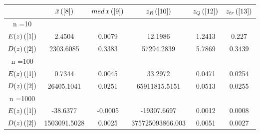 \begin{tabular}{|c|c|c|c|c|c|}
\hline
 & $\bar{x} \, (\ref{8})$ & $med \, x \, (\ref{9})$ & $z_R \, (\ref{10})$ & $z_Q \, (\ref{12})$ & $z_{tr} \, (\ref{13})$ \\
\hline
n =10 &  &  &  &  & \\
\hline
$E(z) \, (\ref{1})$ & 2.4504 & 0.0079 & 12.1986 & 1.2413 & 0.227\\
\hline
$D(z) \, (\ref{2})$ & 2303.6085 & 0.3383 & 57294.2839 & 5.7869 & 0.3439\\
\hline
n =100 &  &  &  &  & \\
\hline
$E(z) \, (\ref{1})$ & 0.7344 & 0.0045 & 33.2972 & 0.0471 & 0.0254\\
\hline
$D(z) \, (\ref{2})$ & 26405.1041 & 0.0251 & 65911815.5151 & 0.0513 & 0.0255\\
\hline
n =1000 &  &  &  &  & \\
\hline
$E(z) \, (\ref{1})$ & -38.6377 & -0.0005 & -19307.6697 & 0.0012 & 0.0008\\
\hline
$D(z) \, (\ref{2})$ & 1503091.5028 & 0.0025 & 375725093866.003 & 0.0051 & 0.0027\\
\hline
\end{tabular}